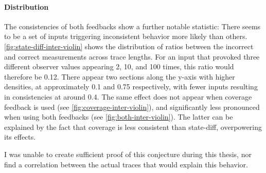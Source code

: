 \documentclass[twocolumn]{article}
\begin{document}
\paragraph{Distribution}


The consistencies of both feedbacks show a further notable statistic: There seems to be a set of inputs triggering inconsistent behavior more likely than others. \cref{fig:state-diff-inter-violin} shows the distribution of ratios between the incorrect and correct measurements across trace lengths. For an input that provoked three different observer values appearing 2, 10, and 100 times, this ratio would therefore be 0.12. There appear two sections along the y-axis with higher densities, at approximately 0.1 and 0.75 respectively, with fewer inputs resulting in consistencies at around 0.4. The same effect does not appear when coverage feedback is used (see \cref{fig:coverage-inter-violin}), and significantly less pronounced when using both feedbacks (see \cref{fig:both-inter-violin}). The latter can be explained by the fact that coverage is less consistent than state-diff, overpowering its effects.

I was unable to create sufficient proof of this conjecture during this thesis, nor find a correlation between the actual traces that would explain this behavior.
\end{document}
